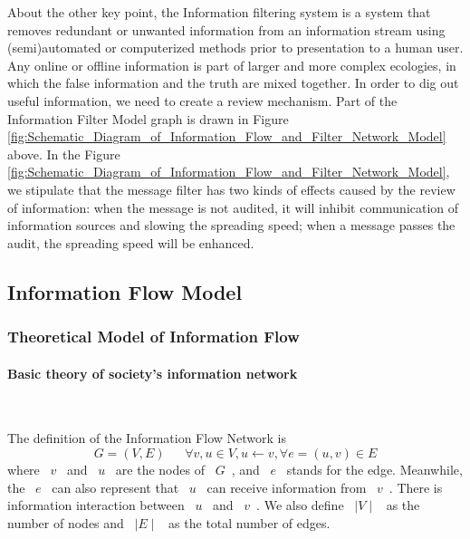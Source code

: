 \documentclass[a4paper,11pt]{article}
\begin{document}
\par About the other key point, the Information filtering system is a system that removes redundant or unwanted information from an information stream using (semi)automated or computerized methods prior to presentation to a human user\cite{RC}. Any online or offline information is part of larger and more complex ecologies, in which the false information and the truth are mixed together. In order to dig out useful information, we need to create a review mechanism. Part of the Information Filter Model graph is drawn in Figure \ref{fig:Schematic_Diagram_of_Information_Flow_and_Filter_Network_Model} above. In the Figure \ref{fig:Schematic_Diagram_of_Information_Flow_and_Filter_Network_Model}, we stipulate that the message filter has two kinds of effects caused by the review of information: when the message is not audited, it will inhibit communication of information sources and slowing the spreading speed; when a message passes the audit, the spreading speed will be enhanced.


\subsection{Information Flow Model}
\subsubsection {Theoretical Model of Information Flow}
\paragraph{Basic theory of society's information network}
\textrm{\\}
\par The definition of the Information Flow Network is 
\begin{equation}
G=(V,E)~~~~~~~\forall  v,u\in V , u\leftarrow v, \forall e=(u,v)\in E 
\end{equation}
where ~$v$~ and ~$u$~ are the nodes of ~$G$~, and ~$e$~ stands for the edge. Meanwhile, the ~$e$~ can also represent that ~$u$~ can receive information from ~$v$~. There is information interaction between ~$u$~ and ~$v$~. We also define ~$\mid V\mid$~ as the number of nodes and ~$\mid E\mid$~ as the total number of edges.
\end{document}
